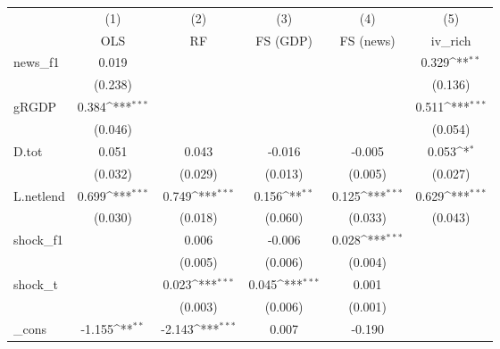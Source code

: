{
\def\sym#1{\ifmmode^{#1}\else\(^{#1}\)\fi}
\begin{tabular}{l*{5}{c}}
\toprule
            &\multicolumn{1}{c}{(1)}&\multicolumn{1}{c}{(2)}&\multicolumn{1}{c}{(3)}&\multicolumn{1}{c}{(4)}&\multicolumn{1}{c}{(5)}\\
            &\multicolumn{1}{c}{OLS}&\multicolumn{1}{c}{RF}&\multicolumn{1}{c}{FS (GDP)}&\multicolumn{1}{c}{FS (news)}&\multicolumn{1}{c}{iv\_rich}\\
\midrule
news\_f1     &       0.019         &                     &                     &                     &       0.329\sym{**} \\
            &     (0.238)         &                     &                     &                     &     (0.136)         \\
\addlinespace
gRGDP       &       0.384\sym{***}&                     &                     &                     &       0.511\sym{***}\\
            &     (0.046)         &                     &                     &                     &     (0.054)         \\
\addlinespace
D.tot       &       0.051         &       0.043         &      -0.016         &      -0.005         &       0.053\sym{*}  \\
            &     (0.032)         &     (0.029)         &     (0.013)         &     (0.005)         &     (0.027)         \\
\addlinespace
L.netlend   &       0.699\sym{***}&       0.749\sym{***}&       0.156\sym{**} &       0.125\sym{***}&       0.629\sym{***}\\
            &     (0.030)         &     (0.018)         &     (0.060)         &     (0.033)         &     (0.043)         \\
\addlinespace
shock\_f1    &                     &       0.006         &      -0.006         &       0.028\sym{***}&                     \\
            &                     &     (0.005)         &     (0.006)         &     (0.004)         &                     \\
\addlinespace
shock\_t     &                     &       0.023\sym{***}&       0.045\sym{***}&       0.001         &                     \\
            &                     &     (0.003)         &     (0.006)         &     (0.001)         &                     \\
\addlinespace
\_cons      &      -1.155\sym{**} &      -2.143\sym{***}&       0.007         &      -0.190         &                     \\

\end{tabular}}
